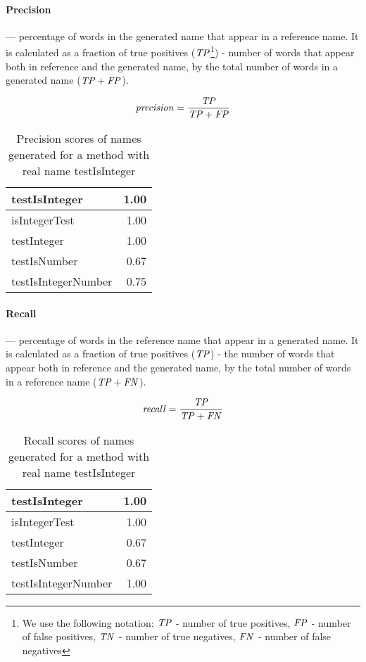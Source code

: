 \paragraph{Precision} --- percentage of words in the generated name that appear in a reference name. It is calculated as a fraction of true positives ($\mathit{TP}$\footnote{We use the following notation: $\mathit{TP}$ - number of true positives, $\mathit{FP}$ - number of false positives, $\mathit{TN}$ - number of true negatives, $\mathit{FN}$ - number of false negatives}) - number of words that appear both in reference and the generated name, by the total number of words in a generated name ($\mathit{TP} + \mathit{FP}$).

\[
\mathit{precision} = \frac{\mathit{TP}}{\mathit{TP} + \mathit{FP}}
\]

\begin{table}[H]
\centering
\begin{tabular}{|l|r|}
  \hline
  testIsInteger & 1.00 \\
  \hline
  isIntegerTest & 1.00 \\
  \hline
  testInteger & 1.00 \\
  \hline
  testIsNumber & 0.67 \\
  \hline
  testIsIntegerNumber & 0.75 \\
  \hline
\end{tabular}
\caption{Precision scores of names generated for a method with real name testIsInteger}
\end{table}

\paragraph{Recall} --- percentage of words in the reference name that appear in a generated name. It is calculated as a fraction of true positives ($\mathit{TP}$) - the number of words that appear both in reference and the generated name, by the total number of words in a reference name ($\mathit{TP} + \mathit{FN}$).

\[
\mathit{recall} = \frac{\mathit{TP}}{\mathit{TP} + \mathit{FN}}
\]

\begin{table}[H]
\centering
\begin{tabular}{|l|r|}
  \hline
  testIsInteger & 1.00 \\
  \hline
  isIntegerTest & 1.00 \\
  \hline
  testInteger & 0.67 \\
  \hline
  testIsNumber & 0.67 \\
  \hline
  testIsIntegerNumber & 1.00 \\
  \hline
\end{tabular}
\caption{Recall scores of names generated for a method with real name testIsInteger}
\end{table}

